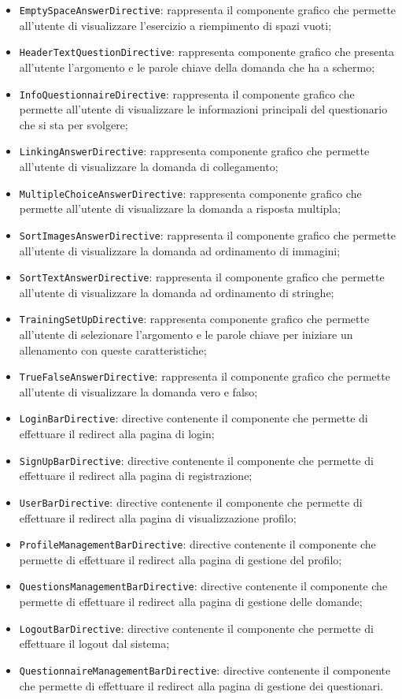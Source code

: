 \begin{itemize}
\begin{itemize}
		\item \texttt{EmptySpaceAnswerDirective}: rappresenta il componente grafico che permette all'utente di visualizzare l'esercizio a riempimento di spazi vuoti;
		\item \texttt{HeaderTextQuestionDirective}: rappresenta componente grafico che presenta all'utente l'argomento e le parole chiave della domanda che ha a schermo;
		\item \texttt{InfoQuestionnaireDirective}: rappresenta il componente grafico che permette all'utente di visualizzare le informazioni principali del questionario che si sta per svolgere;
		\item \texttt{LinkingAnswerDirective}: rappresenta componente grafico che permette all'utente di visualizzare la domanda di collegamento;
		\item \texttt{MultipleChoiceAnswerDirective}: rappresenta componente grafico che permette all'utente di visualizzare la domanda a risposta multipla;
		\item \texttt{SortImagesAnswerDirective}: rappresenta il componente grafico che permette all'utente di visualizzare la domanda ad ordinamento di immagini;
		\item \texttt{SortTextAnswerDirective}: rappresenta il componente grafico che permette all'utente di visualizzare la domanda ad ordinamento di stringhe;
		\item \texttt{TrainingSetUpDirective}: rappresenta componente grafico che permette all'utente di selezionare l'argomento e le parole chiave per iniziare un allenamento con queste caratteristiche;
		\item \texttt{TrueFalseAnswerDirective}: rappresenta il componente grafico che permette all'utente di visualizzare la domanda vero e falso;
		\item \texttt{LoginBarDirective}: directive contenente il componente che permette di effettuare il redirect alla pagina di login;
		\item \texttt{SignUpBarDirective}: directive contenente il componente che permette di effettuare il redirect alla pagina di registrazione;
		\item \texttt{UserBarDirective}: directive contenente il componente che permette di effettuare il redirect alla pagina di visualizzazione profilo;
		\item \texttt{ProfileManagementBarDirective}: directive contenente il componente che permette di effettuare il redirect alla pagina di gestione del profilo;
		\item \texttt{QuestionsManagementBarDirective}: directive contenente il componente che permette di effettuare il redirect alla pagina di gestione delle domande;
		\item \texttt{LogoutBarDirective}: directive contenente il componente che permette di effettuare il logout dal sistema;
		\item \texttt{QuestionnaireManagementBarDirective}: directive contenente il componente che permette di effettuare il redirect alla pagina di gestione dei questionari.
	\end{itemize}
\end{itemize}